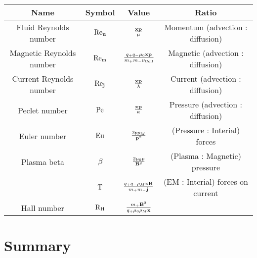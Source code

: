     \begin{center}\begin{tabular}{ c c c c }
        Name  &  Symbol  &  Value  &  Ratio  \\
        \hline\hline
        Fluid Reynolds number  &  $\mathrm{Re}_{\mathbf{u}}$  &  $\frac{\mathbf{x}\mathbf{p}}{\mu}$  &  Momentum (advection : diffusion)  \\
        Magnetic Reynolds number  &  $\mathrm{Re}_{\mathrm{m}}$  &  $\frac{q_{+}q_{-}\mu_{0}\mathbf{x}\mathbf{p}}{m_{+}m_{-}\nu_{\rm Coll}}$  &  Magnetic (advection : diffusion)  \\
        Current Reynolds number  &  $\mathrm{Re}_{\mathbf{j}}$  &  $\frac{\mathbf{x}\mathbf{p}}{\lambda}$  &  Current (advection : diffusion)  \\
        Peclet number  &  $\mathrm{Pe}$  &  $\frac{\mathbf{x}\mathbf{p}}{\kappa}$  &  Pressure (advection : diffusion)  \\
        \hline
        Euler number  &  $\mathrm{Eu}$  &  $\frac{2p\rho_{M}}{\mathbf{p}^{2}}$  &  (Pressure : Interial) forces  \\
        Plasma beta  &  $\beta$  &  $\frac{2\mu_{0}p}{\mathbf{B}^{2}}$  &  (Plasma : Magnetic) pressure  \\
        \BA{??}  &  $\mathrm{T}$  &  $\frac{q_{+}q_{-}\rho_{M}\mathbf{x}\mathbf{B}}{m_{+}m_{-}\mathbf{j}}$  &  (EM : Interial) forces on current  \\
        Hall number  &  $\mathrm{R}_{\mathrm{H}}$  &  $\frac{m_{+}\mathbf{B}^{2}}{q_{+}\mu_{0}\rho_{M}\mathbf{x}}$  &  \BA{??}  \\
    \end{tabular}\end{center}

    
    
    

    
    \section*{Summary}
    